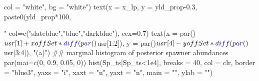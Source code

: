 \documentclass[
  11pt,
]{article}
\newenvironment{Shaded}{}{}
\newcommand{\CommentTok}[1]{\textcolor[rgb]{0.00,0.50,0.00}{#1}}
\newcommand{\DataTypeTok}[1]{#1}
\newcommand{\DecValTok}[1]{#1}
\newcommand{\FloatTok}[1]{#1}
\newcommand{\KeywordTok}[1]{\textcolor[rgb]{0.00,0.00,1.00}{#1}}
\newcommand{\NormalTok}[1]{#1}
\newcommand{\OperatorTok}[1]{#1}
\newcommand{\StringTok}[1]{\textcolor[rgb]{0.00,0.50,0.50}{#1}}
\begin{document}
\begin{Shaded}
\begin{Highlighting}[]
{       \DataTypeTok{col =} \StringTok{"white"}\NormalTok{, }\DataTypeTok{bg =} \StringTok{"white"}\NormalTok{)}
\KeywordTok{text}\NormalTok{(}\DataTypeTok{x =}\NormalTok{ x_lp, }\DataTypeTok{y =}\NormalTok{ yld_prop}\FloatTok{-0.3}\NormalTok{, }\KeywordTok{paste0}\NormalTok{(yld_prop}\OperatorTok{*}\DecValTok{100}\NormalTok{, }\StringTok{"%
     \DataTypeTok{col=}\KeywordTok{c}\NormalTok{(}\StringTok{"slateblue"}\NormalTok{,}\StringTok{"blue"}\NormalTok{,}\StringTok{"darkblue"}\NormalTok{), }\DataTypeTok{cex=}\FloatTok{0.7}\NormalTok{)}
\KeywordTok{text}\NormalTok{(}\DataTypeTok{x =} \KeywordTok{par}\NormalTok{()}\OperatorTok{$}\NormalTok{usr[}\DecValTok{1}\NormalTok{] }\OperatorTok{+}\StringTok{ }\NormalTok{xoffSet }\OperatorTok{*}\StringTok{ }\KeywordTok{diff}\NormalTok{(}\KeywordTok{par}\NormalTok{()}\OperatorTok{$}\NormalTok{usr[}\DecValTok{1}\OperatorTok{:}\DecValTok{2}\NormalTok{]),}
     \DataTypeTok{y =} \KeywordTok{par}\NormalTok{()}\OperatorTok{$}\NormalTok{usr[}\DecValTok{4}\NormalTok{] }\OperatorTok{-}\StringTok{ }\NormalTok{yoffSet }\OperatorTok{*}\StringTok{ }\KeywordTok{diff}\NormalTok{(}\KeywordTok{par}\NormalTok{()}\OperatorTok{$}\NormalTok{usr[}\DecValTok{3}\OperatorTok{:}\DecValTok{4}\NormalTok{]),}
     \StringTok{"(a)"}\NormalTok{)}
\CommentTok{## marginal histogram of posterior spawner abundances}
\KeywordTok{par}\NormalTok{(}\DataTypeTok{mai=}\KeywordTok{c}\NormalTok{(}\DecValTok{0}\NormalTok{, }\FloatTok{0.9}\NormalTok{, }\FloatTok{0.05}\NormalTok{, }\DecValTok{0}\NormalTok{))}
\KeywordTok{hist}\NormalTok{(Sp_ts[Sp_ts}\OperatorTok{<}\FloatTok{1e4}\NormalTok{], }\DataTypeTok{breaks =} \DecValTok{40}\NormalTok{,}
     \DataTypeTok{col =}\NormalTok{ clr, }\DataTypeTok{border =} \StringTok{"blue3"}\NormalTok{, }
     \DataTypeTok{yaxs =} \StringTok{"i"}\NormalTok{, }\DataTypeTok{xaxt =} \StringTok{"n"}\NormalTok{, }\DataTypeTok{yaxt =} \StringTok{"n"}\NormalTok{,}
     \DataTypeTok{main =} \StringTok{""}\NormalTok{, }\DataTypeTok{ylab =} \StringTok{""}\NormalTok{)}

}}
\end{Highlighting}
\end{Shaded}
\end{document}
